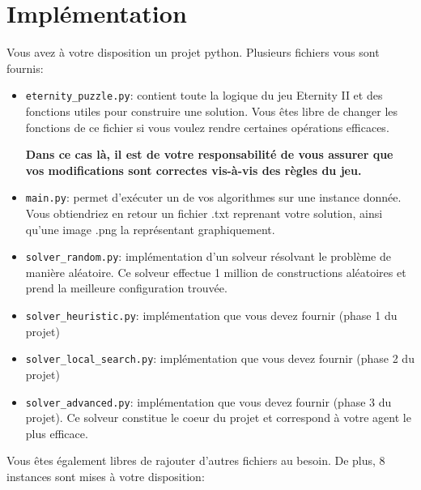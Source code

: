 \documentclass[a4paper,11pt,final,fleqn]{article}
\begin{document}
\section*{Implémentation}

Vous avez à votre disposition un projet python.
Plusieurs fichiers vous sont fournis:

\begin{itemize}
\item \texttt{eternity\_puzzle.py}:  contient toute la logique du jeu Eternity II et des fonctions utiles pour construire une solution.  Vous êtes
libre de changer les fonctions de ce fichier si vous voulez rendre certaines opérations efficaces. 

\textbf{\danger Dans ce cas là, il est de votre responsabilité de vous assurer que vos modifications sont correctes vis-à-vis des règles du jeu.}
\item \texttt{main.py}: permet d'exécuter un de vos algorithmes sur une instance donnée. Vous obtiendriez en retour un fichier .txt reprenant
votre solution, ainsi qu'une image .png la représentant graphiquement.
\item \texttt{solver\_random.py}: implémentation d'un solveur résolvant le problème de manière aléatoire. Ce solveur effectue 1 million de constructions
aléatoires et prend la meilleure configuration trouvée.
 \item \texttt{solver\_heuristic.py}: implémentation que vous devez fournir (phase 1 du projet) 
  \item \texttt{solver\_local\_search.py}: implémentation que vous devez fournir (phase 2 du projet) 
   \item \texttt{solver\_advanced.py}: implémentation que vous devez fournir (phase 3 du projet). 
   Ce solveur constitue le coeur du projet et correspond à votre agent le plus efficace.
\end{itemize}

Vous êtes également libres de rajouter d'autres fichiers au besoin. De plus, 8 instances sont mises à votre disposition:
\end{document}
